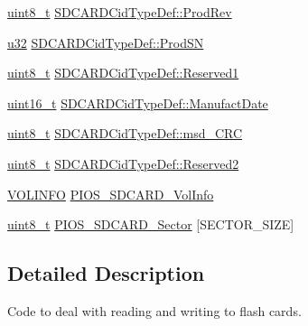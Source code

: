 \begin{DoxyCompactItemize}
\item 
\hyperlink{stdint_8h_aba7bc1797add20fe3efdf37ced1182c5}{uint8\-\_\-t} \hyperlink{group___p_i_o_s___s_d_c_a_r_d_ga8307b63b043ed01d0fa11493c9508dac}{S\-D\-C\-A\-R\-D\-Cid\-Type\-Def\-::\-Prod\-Rev}
\item 
\hyperlink{group___exported__types_gafaa62991928fb9fb18ff0db62a040aba}{u32} \hyperlink{group___p_i_o_s___s_d_c_a_r_d_ga3715cb072043477cb6821ce937c498f8}{S\-D\-C\-A\-R\-D\-Cid\-Type\-Def\-::\-Prod\-S\-N}
\item 
\hyperlink{stdint_8h_aba7bc1797add20fe3efdf37ced1182c5}{uint8\-\_\-t} \hyperlink{group___p_i_o_s___s_d_c_a_r_d_gaa6d5ceee00ac588d04a7d1e913746732}{S\-D\-C\-A\-R\-D\-Cid\-Type\-Def\-::\-Reserved1}
\item 
\hyperlink{stdint_8h_a273cf69d639a59973b6019625df33e30}{uint16\-\_\-t} \hyperlink{group___p_i_o_s___s_d_c_a_r_d_gae7c9d488577977c2c5c2baca30ca6cec}{S\-D\-C\-A\-R\-D\-Cid\-Type\-Def\-::\-Manufact\-Date}
\item 
\hyperlink{stdint_8h_aba7bc1797add20fe3efdf37ced1182c5}{uint8\-\_\-t} \hyperlink{group___p_i_o_s___s_d_c_a_r_d_gaeafc9f7dae979dcf639b88246bbe29b6}{S\-D\-C\-A\-R\-D\-Cid\-Type\-Def\-::msd\-\_\-\-C\-R\-C}
\item 
\hyperlink{stdint_8h_aba7bc1797add20fe3efdf37ced1182c5}{uint8\-\_\-t} \hyperlink{group___p_i_o_s___s_d_c_a_r_d_gab50b795387215c00e5d9b5feb7e9aefb}{S\-D\-C\-A\-R\-D\-Cid\-Type\-Def\-::\-Reserved2}
\item 
\hyperlink{_common_2_libraries_2dosfs_2dosfs_8h_ab15dd212b2a979227ba29f34005a45b7}{V\-O\-L\-I\-N\-F\-O} \hyperlink{group___p_i_o_s___s_d_c_a_r_d_gaeb82765ef4d7741f373422b30dba4f32}{P\-I\-O\-S\-\_\-\-S\-D\-C\-A\-R\-D\-\_\-\-Vol\-Info}
\item 
\hyperlink{stdint_8h_aba7bc1797add20fe3efdf37ced1182c5}{uint8\-\_\-t} \hyperlink{group___p_i_o_s___s_d_c_a_r_d_ga51dd7d1ab7b2ae3878345834e20546a6}{P\-I\-O\-S\-\_\-\-S\-D\-C\-A\-R\-D\-\_\-\-Sector} \mbox{[}S\-E\-C\-T\-O\-R\-\_\-\-S\-I\-Z\-E\mbox{]}
\end{DoxyCompactItemize}


\subsection{Detailed Description}
Code to deal with reading and writing to flash cards. 

